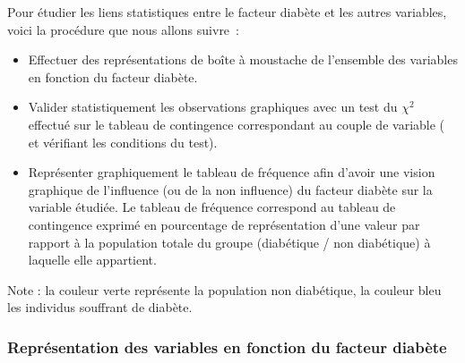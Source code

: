 \documentclass[a4paper,10pt]{report}
\begin{document}
Pour étudier les liens statistiques entre le facteur diabète et les autres variables, voici la procédure que nous allons suivre~:
\begin{itemize}
	\item Effectuer des représentations de boîte à moustache de l'ensemble des variables en fonction du facteur diabète.
	\item Valider statistiquement les observations graphiques avec un test du $\chi^2$ effectué sur le tableau de contingence correspondant au couple de variable ( et vérifiant les conditions du test).
	\item Représenter graphiquement le tableau de fréquence afin d'avoir une vision graphique de l'influence (ou de la non influence) du facteur diabète sur la variable étudiée. Le tableau de fréquence correspond au tableau de contingence exprimé en pourcentage de représentation d'une valeur par rapport à la population totale du groupe (diabétique / non diabétique) à laquelle elle appartient.
\end{itemize}

Note : la couleur verte représente la population non diabétique, la couleur bleu les individus souffrant de diabète. 

\subsubsection{Représentation des variables en fonction du facteur diabète}
\end{document}
